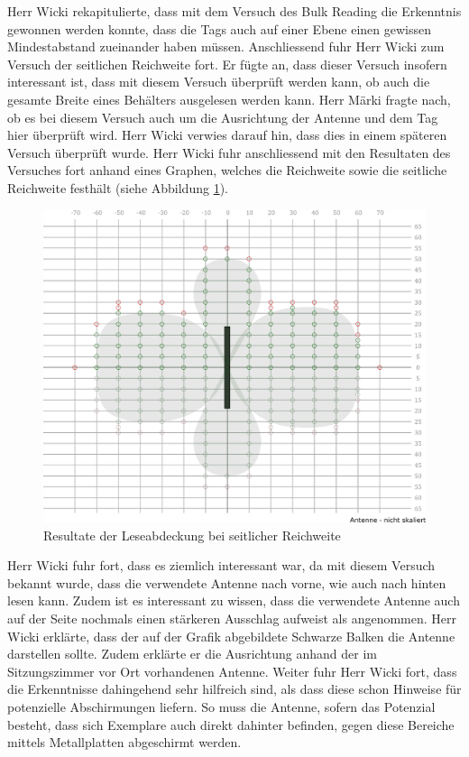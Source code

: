 \documentclass[parskip=full, a4paper]{scrreprt}
\begin{document}
Herr Wicki rekapitulierte, dass mit dem Versuch des Bulk Reading die Erkenntnis gewonnen werden konnte, dass die Tags auch auf einer Ebene einen gewissen Mindestabstand zueinander haben müssen.
Anschliessend fuhr Herr Wicki zum Versuch der seitlichen Reichweite fort. Er fügte an, dass dieser Versuch insofern interessant ist, dass mit diesem Versuch überprüft werden kann, ob auch die gesamte Breite eines Behälters ausgelesen werden kann.
Herr Märki fragte nach, ob es bei diesem Versuch auch um die Ausrichtung der Antenne und dem Tag hier überprüft wird. Herr Wicki verwies darauf hin, dass dies in einem späteren Versuch überprüft wurde.
Herr Wicki fuhr anschliessend mit den Resultaten des Versuches fort anhand eines Graphen, welches die Reichweite sowie die seitliche Reichweite festhält (siehe Abbildung \ref{fig:abdeckungSeitlicheReichweite}).
\begin{figure}[htb]
	\centering
	\includegraphics[keepaspectratio,width=\linewidth]{img/seitlicheReichweiteVersuch}
	\caption{Resultate der Leseabdeckung bei seitlicher Reichweite}
	\label{fig:abdeckungSeitlicheReichweite}
\end{figure}
Herr Wicki fuhr fort, dass es ziemlich interessant war, da mit diesem Versuch bekannt wurde, dass die verwendete Antenne nach vorne, wie auch nach hinten lesen kann. Zudem ist es interessant zu wissen, dass die verwendete Antenne auch auf der Seite nochmals einen stärkeren Ausschlag aufweist als angenommen. Herr Wicki erklärte, dass der auf der Grafik abgebildete Schwarze Balken die Antenne darstellen sollte. Zudem erklärte er die Ausrichtung anhand der im Sitzungszimmer vor Ort vorhandenen Antenne.
Weiter fuhr Herr Wicki fort, dass die Erkenntnisse dahingehend sehr hilfreich sind, als dass diese schon Hinweise für potenzielle Abschirmungen liefern.
So muss die Antenne, sofern das Potenzial besteht, dass sich Exemplare auch direkt dahinter befinden, gegen diese Bereiche mittels Metallplatten abgeschirmt werden.
\end{document}
